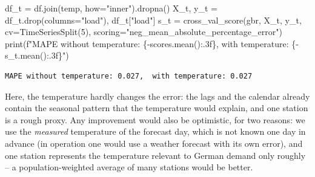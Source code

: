\documentclass[
  letterpaper,
  DIV=11,
  numbers=noendperiod]{scrreprt}
\newenvironment{Shaded}{\begin{snugshade}}{\end{snugshade}}
\newcommand{\BuiltInTok}[1]{\textcolor[rgb]{0.00,0.23,0.31}{#1}}
\newcommand{\DecValTok}[1]{\textcolor[rgb]{0.68,0.00,0.00}{#1}}
\newcommand{\NormalTok}[1]{\textcolor[rgb]{0.00,0.23,0.31}{#1}}
\newcommand{\OperatorTok}[1]{\textcolor[rgb]{0.37,0.37,0.37}{#1}}
\newcommand{\SpecialCharTok}[1]{\textcolor[rgb]{0.37,0.37,0.37}{#1}}
\newcommand{\SpecialStringTok}[1]{\textcolor[rgb]{0.13,0.47,0.30}{#1}}
\newcommand{\StringTok}[1]{\textcolor[rgb]{0.13,0.47,0.30}{#1}}
\begin{document}
\begin{tcolorbox}
\begin{Shaded}
\begin{Highlighting}[]
\NormalTok{df\_t }\OperatorTok{=}\NormalTok{ df.join(temp, how}\OperatorTok{=}\StringTok{"inner"}\NormalTok{).dropna()}
\NormalTok{X\_t, y\_t }\OperatorTok{=}\NormalTok{ df\_t.drop(columns}\OperatorTok{=}\StringTok{"load"}\NormalTok{), df\_t[}\StringTok{"load"}\NormalTok{]}
\NormalTok{s\_t }\OperatorTok{=}\NormalTok{ cross\_val\_score(gbr, X\_t, y\_t, cv}\OperatorTok{=}\NormalTok{TimeSeriesSplit(}\DecValTok{5}\NormalTok{), scoring}\OperatorTok{=}\StringTok{"neg\_mean\_absolute\_percentage\_error"}\NormalTok{)}
\BuiltInTok{print}\NormalTok{(}\SpecialStringTok{f"MAPE without temperature: }\SpecialCharTok{\{}\OperatorTok{{-}}\NormalTok{scores}\SpecialCharTok{.}\NormalTok{mean()}\SpecialCharTok{:.3f\}}\SpecialStringTok{,  with temperature: }\SpecialCharTok{\{}\OperatorTok{{-}}\NormalTok{s\_t}\SpecialCharTok{.}\NormalTok{mean()}\SpecialCharTok{:.3f\}}\SpecialStringTok{"}\NormalTok{)}
\end{Highlighting}
\end{Shaded}

\begin{verbatim}
MAPE without temperature: 0.027,  with temperature: 0.027
\end{verbatim}

Here, the temperature hardly changes the error: the lags and the
calendar already contain the seasonal pattern that the temperature would
explain, and one station is a rough proxy. Any improvement would also be
optimistic, for two reasons: we use the \emph{measured} temperature of
the forecast day, which is not known one day in advance (in operation
one would use a weather forecast with its own error), and one station
represents the temperature relevant to German demand only roughly -- a
population-weighted average of many stations would be better.

\end{tcolorbox}
\end{document}
